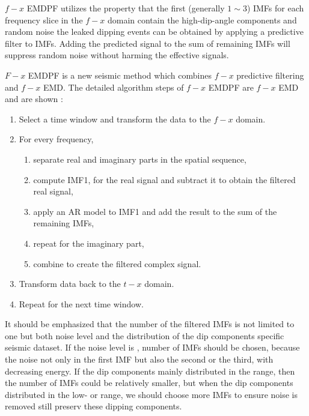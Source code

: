 $f-x$ EMDPF utilizes the property that the first  (generally $1\sim3$) IMFs for each frequency slice in the $f-x$ domain contain the high-dip-angle components and random noise\dlo{,}  the leaked dipping events can be obtained by applying a predictive filter to  IMFs. Adding the predicted signal to the sum of  remaining IMFs will suppress random noise without harming the effective signals. 

$F-x$ EMDPF is a new seismic  method which combines  $f-x$ predictive filtering and $f-x$ EMD. The detailed algorithm steps of $f-x$ EMDPF are  $f-x$ EMD \cite[]{bekara} and are shown :
\begin{enumerate}
\item 
Select a time window and transform the data to the $f-x$ domain.
\item 
For every frequency, 
\begin{enumerate}
\item
separate real and imaginary parts in the spatial sequence,
\item
compute IMF1, for the real signal and subtract it to obtain the filtered real signal,
\item
apply an AR model to IMF1 and add the result to the sum of the remaining IMFs,
\item
repeat for the imaginary part,
\item
combine to create the filtered complex signal.
\end{enumerate}
\item
Transform data back to the $t-x$ domain.
\item
Repeat for the next time window.
\end{enumerate}

It should be emphasized that the number of the filtered IMFs is not limited to one\wen{,} but  both  noise level and the distribution of the dip components  specific seismic data\wen{ }set. If the noise level is ,  number of IMFs should be chosen, because the noise  not only in the first IMF but also  the second or the third,  with decreasing energy. If the dip components  mainly distributed in the  range, then the number of IMFs could be relatively smaller, but when the dip components  distributed in the low- or  range, we should choose more IMFs  to ensure  noise is removed  still preserv these dipping components.

